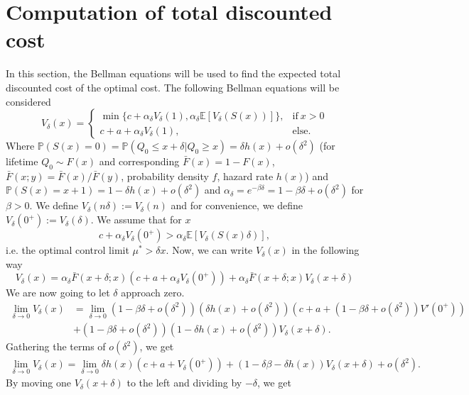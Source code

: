 \section{Computation of total discounted cost}
In this section, the Bellman equations will be used to find the expected total discounted cost of the optimal cost.
The following Bellman equations will be considered
\[V_\delta(x)=\begin{cases}
\min\{c+\alpha_\delta V_\delta(1),\alpha_\delta \mathbb{E}[V_\delta(S(x))]\},&\text{if}\ x>0 \\
c+a+\alpha_\delta V_\delta(1),&\text{else.}
\end{cases}\]
Where $\mathbb{P}(S(x)=0)=\mathbb{P}(Q_0\leq x+\delta|Q_0\geq x)=\delta h(x)+o(\delta^2)$ (for lifetime $Q_0\sim F(x)$ and corresponding $\bar F(x)=1-F(x)$, $\bar F(x;y)=\bar F(x)/\bar F(y)$, probability density $f$, hazard rate $h(x)$) and $\mathbb{P}(S(x)=x+1)=1-\delta h(x)+o(\delta^2)$ and $\alpha_\delta=e^{-\beta \delta}=1-\beta \delta + o(\delta^2)$ for $\beta>0$.
We define $V_\delta(n\delta):=V_\delta(n)$ and for convenience, we define $V_\delta(0^+):=V_\delta(\delta)$.
We assume that for $x$
$$
c+\alpha_\delta V_\delta(0^+)>\alpha_\delta \mathbb{E}[V_\delta(S(x)\delta)],
$$
i.e. the optimal control limit $\mu^*>\delta x$.
Now, we can write $V_\delta(x)$ in the following way
\[V_\delta(x)=\alpha_\delta \bar F(x+\delta;x) (c+a+\alpha_\delta V_\delta(0^+))
+\alpha_\delta \bar F(x+\delta;x)V_\delta(x+\delta)
\]
We are now going to let $\delta$ approach zero.
\begin{equation}
\begin{split}
\lim\limits_{\delta\rightarrow 0} V_\delta(x) &=
\lim\limits_{\delta\rightarrow 0}(1-\beta\delta+o(\delta^2)) (\delta h(x)+o(\delta^2))(c+a+(1-\beta\delta+o(\delta^2)) V'(0^+))\\
&+(1-\beta\delta+o(\delta^2)) (1-\delta h(x)+o(\delta^2))V_\delta(x+\delta).
\end{split}
\end{equation}
Gathering the terms of $o(\delta^2)$, we get
\begin{equation}\label{eq:gatheredDelta}
\begin{split}
\lim\limits_{\delta\rightarrow 0} V_\delta(x) =
\lim\limits_{\delta\rightarrow 0}\delta h(x)(c+a+ V_\delta(0^+))+(1-\delta\beta-\delta h(x)) V_\delta(x+\delta)+o(\delta^2).
\end{split}
\end{equation}
By moving one $V_\delta(x+\delta)$ to the left and dividing by $-\delta$, we get
